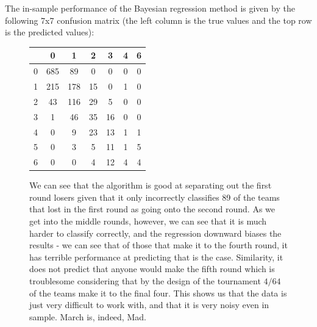 \documentclass[10pt,a4paper, hidelinks]{article} %
\begin{document}
The in-sample performance of the Bayesian regression method is given by the following 7x7 confusion matrix (the left column is the true values and the top row is the predicted values):
\begin{figure}[H]
	\centering
		\begin{tabular}{r|cccccc}
			\toprule
			& 0 & 1 & 2 & 3 & 4 & 6 \\ 
			\midrule
			0 & 685 &  89 &   0 &   0 &   0 &   0 \\ 
			1 & 215 & 178 &  15 &   0 &   1 &   0 \\ 
			2 &  43 & 116 &  29 &   5 &   0 &   0 \\ 
			3 &   1 &  46 &  35 &  16 &   0 &   0 \\ 
			4 &   0 &   9 &  23 &  13 &   1 &   1 \\ 
			5 &   0 &   3 &   5 &  11 &   1 &   5 \\ 
			6 &   0 &   0 &   4 &  12 &   4 &   4 \\ 
			\bottomrule
		\end{tabular}
\caption{We can see that the algorithm is good at separating out the first round losers given that it only incorrectly classifies 89 of the teams that lost in the first round as going onto the second round. As we get into the middle rounds, however, we can see that it is much harder to classify correctly, and the regression downward biases the results - we can see that of those that make it to the fourth round, it has terrible performance at predicting that is the case. Similarity, it does not predict that anyone would make the fifth round which is troublesome considering that by the design of the tournament $4/64$ of the teams make it to the final four. This shows us that the data is just very difficult to work with, and that it is very noisy even in sample. March is, indeed, Mad.}
\end{figure}
\end{document}
